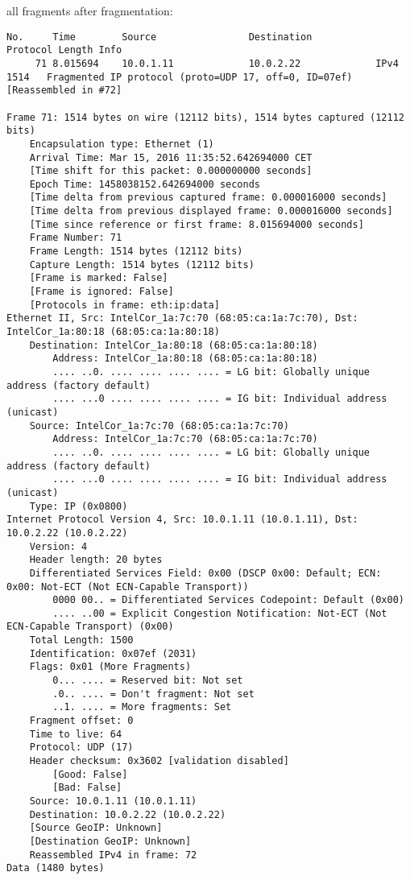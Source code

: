 all fragments after fragmentation:
\begin{lstlisting}
No.     Time        Source                Destination           Protocol Length Info
     71 8.015694    10.0.1.11             10.0.2.22             IPv4     1514   Fragmented IP protocol (proto=UDP 17, off=0, ID=07ef) [Reassembled in #72]

Frame 71: 1514 bytes on wire (12112 bits), 1514 bytes captured (12112 bits)
    Encapsulation type: Ethernet (1)
    Arrival Time: Mar 15, 2016 11:35:52.642694000 CET
    [Time shift for this packet: 0.000000000 seconds]
    Epoch Time: 1458038152.642694000 seconds
    [Time delta from previous captured frame: 0.000016000 seconds]
    [Time delta from previous displayed frame: 0.000016000 seconds]
    [Time since reference or first frame: 8.015694000 seconds]
    Frame Number: 71
    Frame Length: 1514 bytes (12112 bits)
    Capture Length: 1514 bytes (12112 bits)
    [Frame is marked: False]
    [Frame is ignored: False]
    [Protocols in frame: eth:ip:data]
Ethernet II, Src: IntelCor_1a:7c:70 (68:05:ca:1a:7c:70), Dst: IntelCor_1a:80:18 (68:05:ca:1a:80:18)
    Destination: IntelCor_1a:80:18 (68:05:ca:1a:80:18)
        Address: IntelCor_1a:80:18 (68:05:ca:1a:80:18)
        .... ..0. .... .... .... .... = LG bit: Globally unique address (factory default)
        .... ...0 .... .... .... .... = IG bit: Individual address (unicast)
    Source: IntelCor_1a:7c:70 (68:05:ca:1a:7c:70)
        Address: IntelCor_1a:7c:70 (68:05:ca:1a:7c:70)
        .... ..0. .... .... .... .... = LG bit: Globally unique address (factory default)
        .... ...0 .... .... .... .... = IG bit: Individual address (unicast)
    Type: IP (0x0800)
Internet Protocol Version 4, Src: 10.0.1.11 (10.0.1.11), Dst: 10.0.2.22 (10.0.2.22)
    Version: 4
    Header length: 20 bytes
    Differentiated Services Field: 0x00 (DSCP 0x00: Default; ECN: 0x00: Not-ECT (Not ECN-Capable Transport))
        0000 00.. = Differentiated Services Codepoint: Default (0x00)
        .... ..00 = Explicit Congestion Notification: Not-ECT (Not ECN-Capable Transport) (0x00)
    Total Length: 1500
    Identification: 0x07ef (2031)
    Flags: 0x01 (More Fragments)
        0... .... = Reserved bit: Not set
        .0.. .... = Don't fragment: Not set
        ..1. .... = More fragments: Set
    Fragment offset: 0
    Time to live: 64
    Protocol: UDP (17)
    Header checksum: 0x3602 [validation disabled]
        [Good: False]
        [Bad: False]
    Source: 10.0.1.11 (10.0.1.11)
    Destination: 10.0.2.22 (10.0.2.22)
    [Source GeoIP: Unknown]
    [Destination GeoIP: Unknown]
    Reassembled IPv4 in frame: 72
Data (1480 bytes)


\end{lstlisting}
